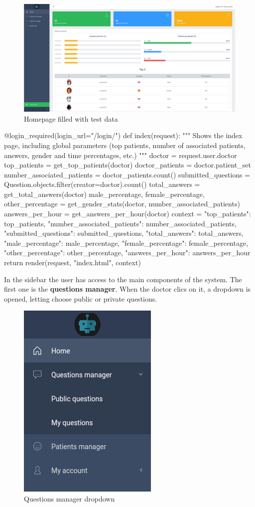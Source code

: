 \documentclass[12pt,english]{article}
\begin{document}
\begin{figure}[H]
    \centering
    \includegraphics[width=\textwidth]{homepage.png}
    \caption{Homepage filled with test data}
\end{figure}
\newpage
\begin{python}[caption={Method to show the main homepage components}, captionpos=b]
  @login_required(login_url="/login/")
  def index(request):
      """
      Shows the index page, including global parameters (top patients, number of associated patients, answers, gender and time percentages, etc.)
      """
      doctor = request.user.doctor
      top_patients = get_top_patients(doctor)
      doctor_patients = doctor.patient_set
      number_associated_patients = doctor_patients.count()
      submitted_questions = Question.objects.filter(creator=doctor).count()
      total_answers = get_total_answers(doctor)
      male_percentage, female_percentage, other_percentage = get_gender_stats(doctor, number_associated_patients)
      answers_per_hour = get_answers_per_hour(doctor)
      context = {
          "top_patients": top_patients,
          "number_associated_patients": number_associated_patients,
          "submitted_questions": submitted_questions,
          "total_answers": total_answers,
          "male_percentage": male_percentage,
          "female_percentage": female_percentage,
          "other_percentage": other_percentage,
          "answers_per_hour": answers_per_hour
      }
      return render(request, "index.html", context)
\end{python}

In the sidebar the user has access to the main components of the system. The first one is the \textbf{questions manager}. When the doctor clics on it, a dropdown is opened, letting choose public or private questions.

\begin{figure}[H]
    \centering
    \includegraphics[width=0.3  \textwidth]{questions_dropdown.png}
    \caption{Questions manager dropdown}
\end{figure}
\end{document}
